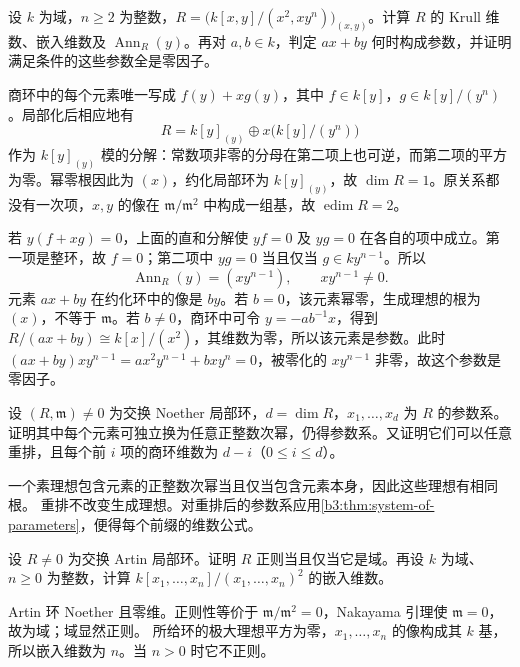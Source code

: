 \begin{exercise}\label{b3:ex:09-parameter-zero-divisor}
	设 \(k\) 为域，\(n\ge2\) 为整数，\(R=\bigl(k[x,y]/(x^2,xy^n)\bigr)_{(x,y)}\)。计算 \(R\) 的 Krull 维数、嵌入维数及 \(\operatorname{Ann}_R(y)\)。再对 \(a,b\in k\)，判定 \(ax+by\) 何时构成参数，并证明满足条件的这些参数全是零因子。
\end{exercise}
\begin{solution}
	商环中的每个元素唯一写成 \(f(y)+xg(y)\)，其中 \(f\in k[y]\)，\(g\in k[y]/(y^n)\)。局部化后相应地有
	\[
		R=k[y]_{(y)}\oplus x\bigl(k[y]/(y^n)\bigr)
	\]
	作为 \(k[y]_{(y)}\) 模的分解：常数项非零的分母在第二项上也可逆，而第二项的平方为零。幂零根因此为 \((x)\)，约化局部环为 \(k[y]_{(y)}\)，故 \(\dim R=1\)。原关系都没有一次项，\(x,y\) 的像在 \(\mathfrak m/\mathfrak m^2\) 中构成一组基，故 \(\operatorname{edim}R=2\)。

	若 \(y(f+xg)=0\)，上面的直和分解使 \(yf=0\) 及 \(yg=0\) 在各自的项中成立。第一项是整环，故 \(f=0\)；第二项中 \(yg=0\) 当且仅当 \(g\in k y^{n-1}\)。所以
	\[
		\operatorname{Ann}_R(y)=(xy^{n-1}),\qquad xy^{n-1}\ne0.
	\]
	元素 \(ax+by\) 在约化环中的像是 \(by\)。若 \(b=0\)，该元素幂零，生成理想的根为 \((x)\)，不等于 \(\mathfrak m\)。若 \(b\ne0\)，商环中可令 \(y=-ab^{-1}x\)，得到 \(R/(ax+by)\cong k[x]/(x^2)\)，其维数为零，所以该元素是参数。此时 \((ax+by)xy^{n-1}=ax^2y^{n-1}+bxy^n=0\)，被零化的 \(xy^{n-1}\) 非零，故这个参数是零因子。
\end{solution}

\begin{exercise}\label{b3:ex:09-parameter-powers}
	设 \((R,\mathfrak m)\ne0\) 为交换 Noether 局部环，\(d=\dim R\)，\(x_1,\ldots,x_d\) 为 \(R\) 的参数系。证明其中每个元素可独立换为任意正整数次幂，仍得参数系。又证明它们可以任意重排，且每个前 \(i\) 项的商环维数为 \(d-i\)（\(0\le i\le d\)）。
\end{exercise}
\begin{solution}
	一个素理想包含元素的正整数次幂当且仅当包含元素本身，因此这些理想有相同根。 重排不改变生成理想。对重排后的参数系应用\cref{b3:thm:system-of-parameters}，便得每个前缀的维数公式。
\end{solution}

\begin{exercise}\label{b3:ex:09-artin-regular}
	设 \(R\ne0\) 为交换 Artin 局部环。证明 \(R\) 正则当且仅当它是域。再设 \(k\) 为域、\(n\ge0\) 为整数，计算 \(k[x_1,\ldots,x_n]/(x_1,\ldots,x_n)^2\) 的嵌入维数。
\end{exercise}
\begin{solution}
	Artin 环 Noether 且零维。正则性等价于 \(\mathfrak m/\mathfrak m^2=0\)，Nakayama 引理使 \(\mathfrak m=0\)，故为域；域显然正则。 所给环的极大理想平方为零，\(x_1,\ldots,x_n\) 的像构成其 \(k\) 基，所以嵌入维数为 \(n\)。当 \(n>0\) 时它不正则。
\end{solution}

